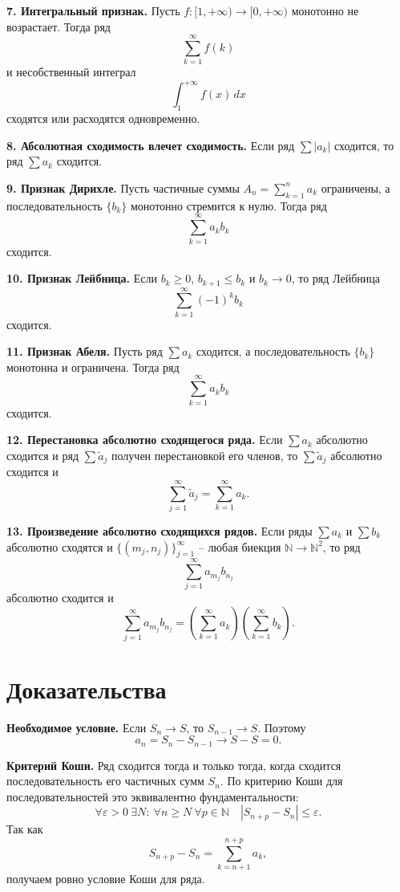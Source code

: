 \documentclass[12pt,a4paper]{article}
\newcommand{\N}{\mathbb{N}}
\newcommand{\eps}{\varepsilon}
\begin{document}
\textbf{7. Интегральный признак.}
Пусть \(f\colon[1,+\infty)\to[0,+\infty)\) монотонно не возрастает. Тогда
ряд
\[
  \sum_{k=1}^{\infty} f(k)
\]
и несобственный интеграл
\[
  \int_{1}^{+\infty}f(x)\,dx
\]
сходятся или расходятся одновременно.

\textbf{8. Абсолютная сходимость влечет сходимость.}
Если ряд \(\sum |a_k|\) сходится, то ряд \(\sum a_k\) сходится.

\textbf{9. Признак Дирихле.}
Пусть частичные суммы \(A_n=\sum_{k=1}^{n}a_k\) ограничены, а
последовательность \(\{b_k\}\) монотонно стремится к нулю. Тогда ряд
\[
  \sum_{k=1}^{\infty}a_k b_k
\]
сходится.

\textbf{10. Признак Лейбница.}
Если \(b_k\ge0\), \(b_{k+1}\le b_k\) и \(b_k\to0\), то ряд Лейбница
\[
  \sum_{k=1}^{\infty}(-1)^k b_k
\]
сходится.

\textbf{11. Признак Абеля.}
Пусть ряд \(\sum a_k\) сходится, а последовательность \(\{b_k\}\) монотонна и
ограничена. Тогда ряд
\[
  \sum_{k=1}^{\infty}a_k b_k
\]
сходится.

\textbf{12. Перестановка абсолютно сходящегося ряда.}
Если \(\sum a_k\) абсолютно сходится и ряд
\(\sum \widetilde a_j\) получен перестановкой его членов, то
\(\sum \widetilde a_j\) абсолютно сходится и
\[
  \sum_{j=1}^{\infty}\widetilde a_j
  =
  \sum_{k=1}^{\infty}a_k.
\]

\textbf{13. Произведение абсолютно сходящихся рядов.}
Если ряды \(\sum a_k\) и \(\sum b_k\) абсолютно сходятся и
\(\{(m_j,n_j)\}_{j=1}^{\infty}\) -- любая биекция \(\N\to\N^2\), то ряд
\[
  \sum_{j=1}^{\infty}a_{m_j}b_{n_j}
\]
абсолютно сходится и
\[
  \sum_{j=1}^{\infty}a_{m_j}b_{n_j}
  =
  \left(\sum_{k=1}^{\infty}a_k\right)
  \left(\sum_{k=1}^{\infty}b_k\right).
\]

\section*{Доказательства}

\textbf{Необходимое условие.}
Если \(S_n\to S\), то \(S_{n-1}\to S\). Поэтому
\[
  a_n=S_n-S_{n-1}\to S-S=0.
\]

\textbf{Критерий Коши.}
Ряд сходится тогда и только тогда, когда сходится последовательность его
частичных сумм \(S_n\). По критерию Коши для последовательностей это
эквивалентно фундаментальности:
\[
  \forall\eps>0\ \exists N:\ \forall n\ge N\ \forall p\in\N
  \quad |S_{n+p}-S_n|\le\eps.
\]
Так как
\[
  S_{n+p}-S_n=\sum_{k=n+1}^{n+p}a_k,
\]
получаем ровно условие Коши для ряда.
\end{document}
